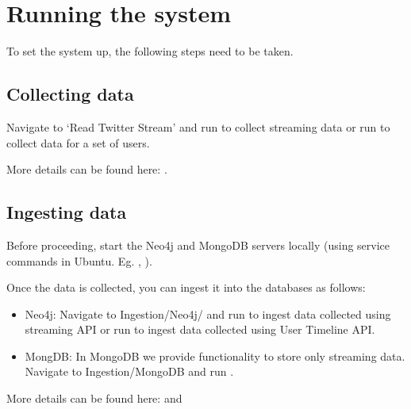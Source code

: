 \documentclass[letterpaper,10pt,english]{sphinxmanual}
\begin{document}
\section{Running the system}
\label{\detokenize{running:running-the-system}}
To set the system up, the following steps need to be taken.


\subsection{Collecting data}
\label{\detokenize{running:collecting-data}}
Navigate to ‘Read Twitter Stream’ and run  to collect streaming data or run  to collect data for a set of users.

More details can be found here: {\hyperref[\detokenize{twitter_stream:read-data-from-twitter-api}]{}}.


\subsection{Ingesting data}
\label{\detokenize{running:ingesting-data}}
Before proceeding, start the Neo4j and MongoDB servers locally (using service commands in Ubuntu. Eg. , ).

Once the data is collected, you can ingest it into the databases as follows:
\begin{itemize}
\item {} 
Neo4j: Navigate to Ingestion/Neo4j/ and run  to ingest data collected using streaming API or run  to ingest data collected using User Timeline API.

\item {} 
MongDB: In MongoDB we provide functionality to store only streaming data. Navigate to Ingestion/MongoDB and run .

\end{itemize}

More details can be found here: {\hyperref[\detokenize{mongoDB_data_ingestion:ingesting-data-into-mongodb}]{}} and {\hyperref[\detokenize{neo4j_data_ingestion:ingesting-data-into-neo4j}]{}}
\end{document}
